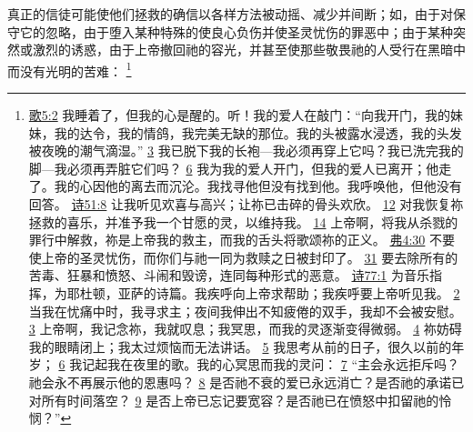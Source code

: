 \documentclass[12pt, a4paper, oneside]{ctexart}
\newcounter{parnum}[section]
\newcommand{\N}{%
   \noindent\refstepcounter{parnum}%
    \makebox[\parindent][l]{\textbf{\arabic{parnum}.}}}
\begin{document}
\N 真正的信徒可能使他们拯救的确信以各样方法被动摇、减少并间断；如，由于对保守它的忽略，由于堕入某种特殊的使良心负伤并使圣灵忧伤的罪恶中；由于某种突然或激烈的诱惑，由于上帝撤回祂的容光，并甚至使那些敬畏祂的人受行在黑暗中而没有光明的苦难：
	\footnote {
		\href{https://biblehub.com/songs/5-2.htm}{歌5:2} 我睡着了，但我的心是醒的。听！我的爱人在敲门：“向我开门，我的妹妹，我的达令，我的情鸽，我完美无缺的那位。我的头被露水浸透，我的头发被夜晚的潮气滴湿。”
		\href{https://biblehub.com/songs/5-3.htm}{3} 我已脱下我的长袍---我必须再穿上它吗？我已洗完我的脚---我必须再弄脏它们吗？
		\href{https://biblehub.com/songs/5-6.htm}{6} 我为我的爱人开门，但我的爱人已离开；他走了。我的心因他的离去而沉沦。我找寻他但没有找到他。我呼唤他，但他没有回答。
		\href{https://biblehub.com/psalms/51-8.htm}{诗51:8} 让我听见欢喜与高兴；让祢已击碎的骨头欢欣。
		\href{https://biblehub.com/psalms/51-12.htm}{12} 对我恢复祢拯救的喜乐，并准予我一个甘愿的灵，以维持我。
        \href{https://biblehub.com/psalms/51-14.htm}{14} 上帝啊，将我从杀戮的罪行中解救，祢是上帝我的救主，而我的舌头将歌颂祢的正义。
		\href{https://biblehub.com/ephesians/4-30.htm}{弗4:30} 不要使上帝的圣灵忧伤，而你们与祂一同为救赎之日被封印了。
		\href{https://biblehub.com/ephesians/4-31.htm}{31} 要去除所有的苦毒、狂暴和愤怒、斗闹和毁谤，连同每种形式的恶意。
		\href{https://biblehub.com/psalms/77-1.htm}{诗77:1} 为音乐指挥，为耶杜顿，亚萨的诗篇。我疾呼向上帝求帮助；我疾呼要上帝听见我。
		\href{https://biblehub.com/psalms/77-2.htm}{2} 当我在忧痛中时，我寻求主；夜间我伸出不知疲倦的双手，我却不会被安慰。
		\href{https://biblehub.com/psalms/77-3.htm}{3} 上帝啊，我记念祢，我就叹息；我冥思，而我的灵逐渐变得微弱。
		\href{https://biblehub.com/psalms/77-4.htm}{4} 祢妨碍我的眼睛闭上；我太过烦恼而无法讲话。
		\href{https://biblehub.com/psalms/77-5.htm}{5} 我思考从前的日子，很久以前的年岁；
		\href{https://biblehub.com/psalms/77-6.htm}{6} 我记起我在夜里的歌。我的心冥思而我的灵问：
		\href{https://biblehub.com/psalms/77-7.htm}{7} “主会永远拒斥吗？祂会永不再展示他的恩惠吗？
		\href{https://biblehub.com/psalms/77-8.htm}{8} 是否祂不衰的爱已永远消亡？是否祂的承诺已对所有时间落空？
		\href{https://biblehub.com/psalms/77-9.htm}{9} 是否上帝已忘记要宽容？是否祂已在愤怒中扣留祂的怜悯？”
}
\end{document}
